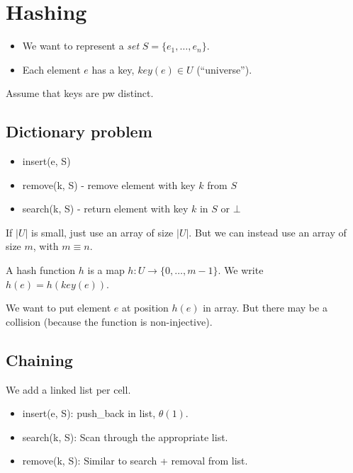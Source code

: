 \newpage

\section{Hashing}

\begin{itemize}
\item We want to represent a \emph{set} $S = \{e_1,\ldots,e_n\}$.
\item Each element $e$ has a key, ${key}(e) \in U$ (``universe'').
\end{itemize}

Assume that keys are pw distinct.

\subsection{Dictionary problem}

\begin{itemize}
\item insert(e, S)
\item remove(k, S) - remove element with key $k$ from $S$
\item search(k, S) - return element with key $k$ in $S$ or $\bot$
\end{itemize}

If $|U|$ is small, just use an array of size $|U|$. But we can instead use an array of size $m$, with $m \equiv n$.

\begin{mydefinition}
A hash function $h$ is a map $h: U \rightarrow \{0, \ldots, m-1\}$. We write $h(e) = h(key(e))$.
\end{mydefinition}

We want to put element $e$ at position $h(e)$ in array. But there may be a collision (because the function is non-injective).

\subsection{Chaining}

We add a linked list per cell.

\begin{itemize}
\item insert(e, S): push\_back in list, $\theta(1)$.
\item search(k, S): Scan through the appropriate list.
\item remove(k, S): Similar to search + removal from list.
\end{itemize}


